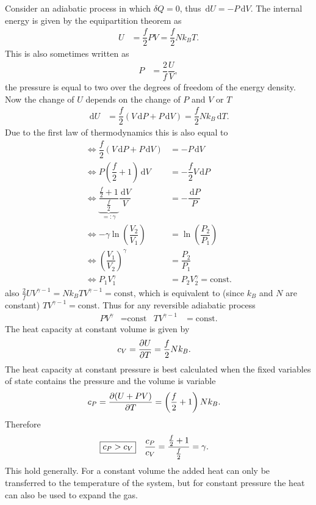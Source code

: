 \documentclass[a4paper,10pt]{article}
\newcommand{\td}{\,\text{d}}
\numberwithin{equation}{section}
\begin{document}
\begin{multicols}{2}
Consider an adiabatic process in which $\delta Q=0$, thus $\td U=-P\td V$.
The internal energy is given by the equipartition theorem as
\begin{align} 
  U &= \dfrac{f}{2}PV = \dfrac{f}{2}Nk_BT
.\end{align} 
This is also sometimes written as
\begin{align} 
  P &= \dfrac{2}{f}\dfrac{U}{V}
,\end{align} 
the pressure is equal to two over the degrees of freedom of the energy density.
Now the change of $U$ depends on the change of $P$ and $V$ or $T$
\begin{align} 
  \td U &= \dfrac{f}{2}\left(V\td P + P\td V\right) = \dfrac{f}{2}Nk_B\td T
.\end{align} 
Due to the first law of thermodynamics this is also equal to
\begin{align} 
  \Leftrightarrow \dfrac{f}{2}(V\td P + P\td V) &= -P\td V \\
  \Leftrightarrow P\left(\dfrac{f}{2}+1\right)\td V &= -\dfrac{f}{2}V\td P\\
  \Leftrightarrow \underbrace{\dfrac{\tfrac{f}{2}+1}{\tfrac{f}{2}}}_{=:\gamma }\dfrac{\td V}{V} &= -\dfrac{\td P}{P}\\
  \Leftrightarrow -\gamma \ln\left(\dfrac{V_2}{V_1}\right) &= \ln\left(\dfrac{P_2}{P_1}\right)\\
  \Leftrightarrow \left(\dfrac{V_1}{V_2}\right)^{\gamma } &= \dfrac{P_2}{P_1}\\
  \Leftrightarrow P_1V_1^\gamma  &= P_2V_2^\gamma =\text{const}
.\end{align} 
also $\tfrac{2}{f}UV^{\gamma -1}=Nk_BTV^{\gamma -1}=\text{const}$, which is equivalent to (since $k_B$ and $N$ are constant) $TV^{\gamma -1}=\text{const}$.
Thus for any reversible adiabatic process
\begin{align} 
  PV^\gamma  &= \text{const} & TV^{\gamma -1} &= \text{const}
.\end{align} 
The heat capacity at constant volume is given by
\begin{align} 
  c_V &= \diffp[]{U}{T} = \dfrac{f}{2}Nk_B
.\end{align} 
The heat capacity at constant pressure is best calculated when the fixed variables of state contains the pressure and the volume is variable
\begin{align} 
  c_P &= \diffp[]{(U+PV)}{T} = \left(\dfrac{f}{2}+1\right)Nk_B
.\end{align} 
Therefore
\begin{align} 
  \Aboxed{c_P&>c_V} & \dfrac{c_P}{c_V}&=\dfrac{\tfrac{f}{2}+1}{\tfrac{f}{2}}=\gamma 
.\end{align} 
This hold generally.
For a constant volume the added heat can only be transferred to the temperature of the system, but for constant pressure the heat can also be used to expand the gas.


\end{multicols}
\end{document}
